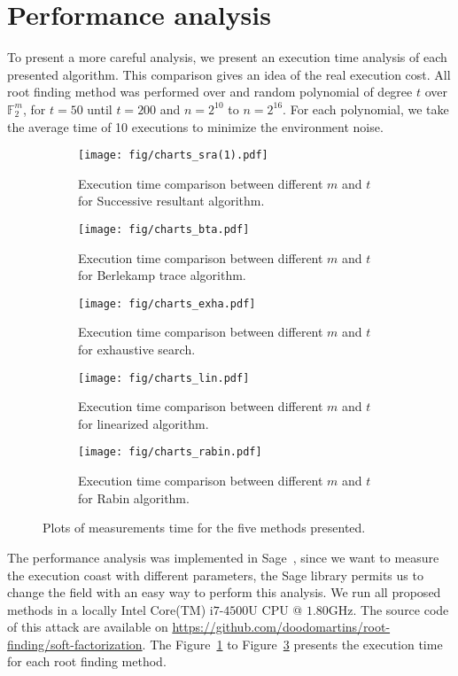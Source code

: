 \section{Performance analysis}
To present a more careful analysis, we present an execution time analysis of each presented algorithm. This comparison gives an idea of the real execution cost. All root finding method was performed over and random polynomial of degree $t$ over $\mathbb{F}_2^m$, for $t = 50$ until $t = 200$ and $n = 2^10$ to $n = 2^{16}$. For each polynomial, we take the average time of 10 executions to minimize the environment noise.
 

\begin{figure}[ht]
\centering
\begin{subfigure}{0.48\textwidth}
  \centering
  \texttt{[image: fig/charts\_sra(1).pdf]}
  \caption{Execution time comparison between different $m$ and $t$ for Successive resultant algorithm.}
  \label{fig:time-SRA}
\end{subfigure}
\begin{subfigure}{0.48\textwidth}
  \centering
  \texttt{[image: fig/charts\_bta.pdf]}
  \caption{Execution time comparison between different $m$ and $t$ for Berlekamp trace algorithm.}
  \label{fig:time-BTA}
\end{subfigure}
\begin{subfigure}{0.48\textwidth}
  \centering
  \texttt{[image: fig/charts\_exha.pdf]}
  \caption{Execution time comparison between different $m$ and $t$ for exhaustive search.}
  \label{fig:time-EXHA}
\end{subfigure}
\begin{subfigure}{0.48\textwidth}
  \centering
  \texttt{[image: fig/charts\_lin.pdf]}
  \caption{Execution time comparison between different $m$ and $t$ for linearized algorithm.}
  \label{fig:time-LIN}
\end{subfigure}
\begin{subfigure}{0.48\textwidth}
  \centering
  \texttt{[image: fig/charts\_rabin.pdf]}
  \caption{Execution time comparison between different $m$ and $t$ for Rabin algorithm.}
  \label{fig:time-rabin}
\end{subfigure}

\caption{Plots of measurements time for the five methods presented.}
\label{fig:graph}
\end{figure}

The performance analysis was implemented in Sage~\cite{sage}, since we want to measure the execution coast with different parameters, the Sage library permits us to change the field with an easy way to perform this analysis. We run all proposed methods in a locally Intel\textsuperscript{\tiny\textregistered} Core(TM) i$7$-$4500$U CPU @ $1.80$GHz. The source code of this attack are available on \url{https://github.com/doodomartins/root-finding/soft-factorization}. The Figure~\ref{fig:time-SRA} to Figure~\ref{fig:time-EXHA} presents the execution time for each root finding method.

